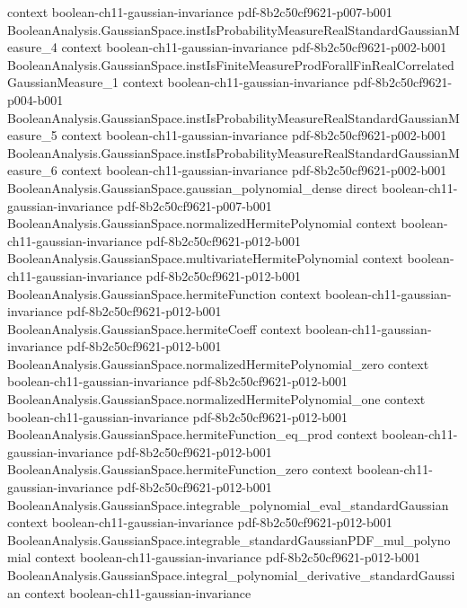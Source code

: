 \begin{lemma}
  {context}
  {boolean-ch11-gaussian-invariance}
  {pdf-8b2c50cf9621-p007-b001}
\proofstep
  {BooleanAnalysis.GaussianSpace.instIsProbabilityMeasureRealStandardGaussianMeasure_4}
  {context}
  {boolean-ch11-gaussian-invariance}
  {pdf-8b2c50cf9621-p002-b001}
\proofstep
  {BooleanAnalysis.GaussianSpace.instIsFiniteMeasureProdForallFinRealCorrelatedGaussianMeasure_1}
  {context}
  {boolean-ch11-gaussian-invariance}
  {pdf-8b2c50cf9621-p004-b001}
\proofstep
  {BooleanAnalysis.GaussianSpace.instIsProbabilityMeasureRealStandardGaussianMeasure_5}
  {context}
  {boolean-ch11-gaussian-invariance}
  {pdf-8b2c50cf9621-p002-b001}
\proofstep
  {BooleanAnalysis.GaussianSpace.instIsProbabilityMeasureRealStandardGaussianMeasure_6}
  {context}
  {boolean-ch11-gaussian-invariance}
  {pdf-8b2c50cf9621-p002-b001}
\proofstep
  {BooleanAnalysis.GaussianSpace.gaussian_polynomial_dense}
  {direct}
  {boolean-ch11-gaussian-invariance}
  {pdf-8b2c50cf9621-p007-b001}
\proofstep
  {BooleanAnalysis.GaussianSpace.normalizedHermitePolynomial}
  {context}
  {boolean-ch11-gaussian-invariance}
  {pdf-8b2c50cf9621-p012-b001}
\proofstep
  {BooleanAnalysis.GaussianSpace.multivariateHermitePolynomial}
  {context}
  {boolean-ch11-gaussian-invariance}
  {pdf-8b2c50cf9621-p012-b001}
\proofstep
  {BooleanAnalysis.GaussianSpace.hermiteFunction}
  {context}
  {boolean-ch11-gaussian-invariance}
  {pdf-8b2c50cf9621-p012-b001}
\proofstep
  {BooleanAnalysis.GaussianSpace.hermiteCoeff}
  {context}
  {boolean-ch11-gaussian-invariance}
  {pdf-8b2c50cf9621-p012-b001}
\proofstep
  {BooleanAnalysis.GaussianSpace.normalizedHermitePolynomial_zero}
  {context}
  {boolean-ch11-gaussian-invariance}
  {pdf-8b2c50cf9621-p012-b001}
\proofstep
  {BooleanAnalysis.GaussianSpace.normalizedHermitePolynomial_one}
  {context}
  {boolean-ch11-gaussian-invariance}
  {pdf-8b2c50cf9621-p012-b001}
\proofstep
  {BooleanAnalysis.GaussianSpace.hermiteFunction_eq_prod}
  {context}
  {boolean-ch11-gaussian-invariance}
  {pdf-8b2c50cf9621-p012-b001}
\proofstep
  {BooleanAnalysis.GaussianSpace.hermiteFunction_zero}
  {context}
  {boolean-ch11-gaussian-invariance}
  {pdf-8b2c50cf9621-p012-b001}
\proofstep
  {BooleanAnalysis.GaussianSpace.integrable_polynomial_eval_standardGaussian}
  {context}
  {boolean-ch11-gaussian-invariance}
  {pdf-8b2c50cf9621-p012-b001}
\proofstep
  {BooleanAnalysis.GaussianSpace.integrable_standardGaussianPDF_mul_polynomial}
  {context}
  {boolean-ch11-gaussian-invariance}
  {pdf-8b2c50cf9621-p012-b001}
\proofstep
  {BooleanAnalysis.GaussianSpace.integral_polynomial_derivative_standardGaussian}
  {context}
  {boolean-ch11-gaussian-invariance}

\end{lemma}
